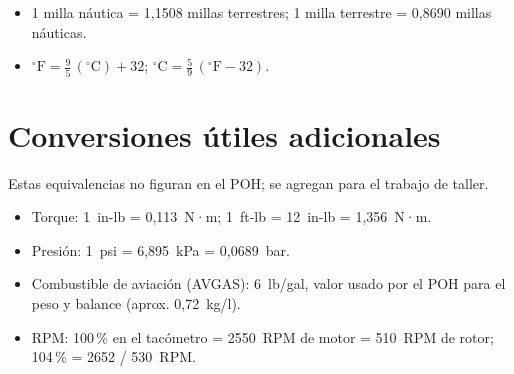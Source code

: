 \begin{itemize}
\item 1 milla náutica = 1,1508 millas terrestres; 1 milla terrestre = 0,8690 millas náuticas.
\item $^\circ\mathrm{F} = \tfrac{9}{5}\,(^\circ\mathrm{C}) + 32$; \quad $^\circ\mathrm{C} = \tfrac{5}{9}\,(^\circ\mathrm{F} - 32)$.
\end{itemize}

\section*{Conversiones útiles adicionales}

Estas equivalencias no figuran en el POH; se agregan para el trabajo de taller.

\begin{itemize}
\item Torque: 1~in-lb = 0,113~N·m; 1~ft-lb = 12~in-lb = 1,356~N·m.
\item Presión: 1~psi = 6,895~kPa = 0,0689~bar.
\item Combustible de aviación (AVGAS): 6~lb/gal, valor usado por el POH para el peso y balance (aprox. 0,72~kg/l).
\item RPM: 100\,\% en el tacómetro = 2550~RPM de motor = 510~RPM de rotor; 104\,\% = 2652 / 530~RPM.
\end{itemize}
